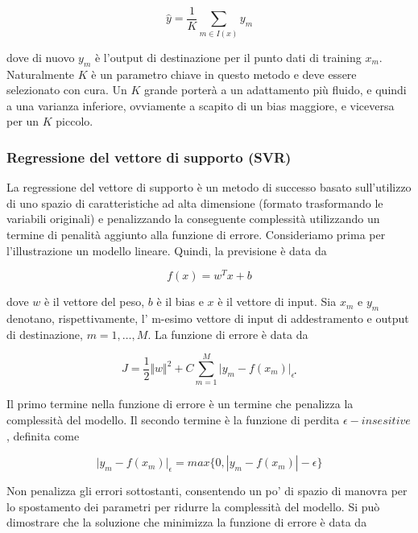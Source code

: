 \documentclass[12pt,a4paper]{report}
\begin{document}
\begin{equation}
    {\displaystyle \hat{y} = \frac{1}{K} \sum\limits_{m \in I(x)} y_m}
\end{equation}

dove di nuovo $y_m$ è l'output di destinazione per il punto dati di training $x_m$.
Naturalmente $K$ è un parametro chiave in questo metodo e deve essere selezionato con cura. Un $K$ grande porterà a un adattamento più fluido, e quindi a una varianza inferiore, ovviamente a scapito di un bias maggiore, e viceversa per un $K$ piccolo.

\subsubsection{Regressione del vettore di supporto (SVR)}
La regressione del vettore di supporto è un metodo di successo basato sull'utilizzo di uno spazio di caratteristiche ad alta dimensione (formato trasformando le variabili originali) e penalizzando la conseguente complessità utilizzando un termine di penalità aggiunto alla funzione di errore. Consideriamo prima per l'illustrazione un modello lineare. Quindi, la previsione è data da

\begin{equation}
    {\displaystyle f(x) = w^Tx + b}
\end{equation}

dove $w$ è il vettore del peso, $b$ è il bias e $x$ è il vettore di input. Sia $x_m$ e $y_m$ denotano, rispettivamente, l' m-esimo vettore di input di addestramento e output di destinazione, $m = 1, …, M$. La funzione di errore è data da 

\begin{equation}
    {\displaystyle J = \frac{1}{2}\Vert w \Vert^2 + C\sum\limits_{m=1}^M\vert y_m - f(x_m) \vert_{\epsilon^{\centerdot}} }
\end{equation}

Il primo termine nella funzione di errore è un termine che penalizza la complessità del modello. Il secondo termine è la funzione di perdita $\epsilon-insesitive$, definita come

\begin{equation}
    {\displaystyle \vert y_m - f(x_m) \vert_{\epsilon} = max\{0,|y_m - f(x_m)|-\epsilon\}}
\end{equation}

Non penalizza gli errori sottostanti, consentendo un po' di spazio di manovra per lo spostamento dei parametri per ridurre la complessità del modello. Si può dimostrare che la soluzione che minimizza la funzione di errore è data da
\end{document}
